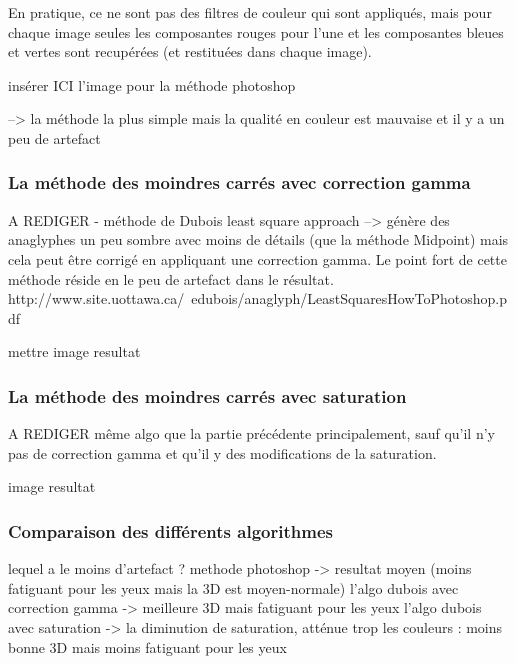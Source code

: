 	En pratique, ce ne sont pas des filtres de couleur qui sont appliqués, mais pour chaque image seules les composantes rouges pour l'une et les composantes bleues et vertes sont recupérées (et restituées dans chaque image).
	
	 insérer ICI l'image pour la méthode photoshop
	

	--> la méthode la plus simple mais la qualité en couleur est mauvaise et il y a un peu de artefact
\subsubsection{La méthode des moindres carrés avec correction gamma}
A REDIGER
- méthode de Dubois least square approach
--> génère des anaglyphes un peu sombre avec moins de détails (que la méthode Midpoint) mais cela peut être corrigé en appliquant une correction gamma. Le point fort de cette méthode réside en le peu de artefact dans le résultat.
http://www.site.uottawa.ca/~edubois/anaglyph/LeastSquaresHowToPhotoshop.pdf

mettre image resultat

\subsubsection{La méthode des moindres carrés avec saturation}
A REDIGER
même algo que la partie précédente principalement, sauf qu'il n'y pas de correction gamma et qu'il y des modifications de la saturation.

image resultat

\subsubsection{Comparaison des différents algorithmes}

lequel a le moins d'artefact ?
methode photoshop -> resultat moyen (moins fatiguant pour les yeux mais la 3D est moyen-normale)
l'algo dubois avec correction gamma -> meilleure 3D mais fatiguant pour les yeux
l'algo dubois avec saturation -> la diminution de saturation, atténue trop les couleurs : moins bonne 3D mais moins fatiguant pour les yeux 




